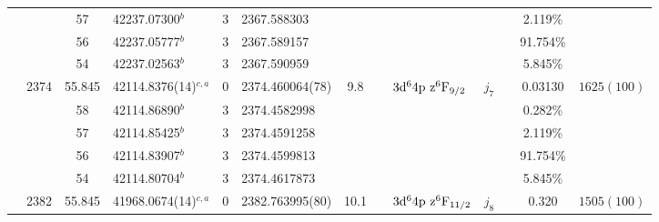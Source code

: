 \begin{table*}
\begin{center}
{\begin{tabular}{:l;l;c;l;c;l;c;l;l;c;c;c;c}
\rowstyle{\itshape}               &        & 57        & 42237.07300$^{b}$                & 3 &   2367.588303      &      & $                                        $ & $                                        $ & $      $ &              & 2.119\%   & $          $\\
\rowstyle{\itshape}               &        & 56        & 42237.05777$^{b}$                & 3 &   2367.589157      &      & $                                        $ & $                                        $ & $      $ &              & 91.754\%  & $          $\\
\rowstyle{\itshape}               &        & 54        & 42237.02563$^{b}$                & 3 &   2367.590959      &      & $                                        $ & $                                        $ & $      $ &              & 5.845\%   & $          $\\
                                  & 2374   & 55.845    & 42114.8376(14)$^{c,a}$           & 0 &   2374.460064(78)  &  9.8 & $                                        $ & $3\rm{d}^64\rm{p~z}^6\rm{F}_{9/2}        $ & $j_{7} $ &              & 0.03130   & $ 1625(100)$\\
\rowstyle{\itshape}               &        & 58        & 42114.86890$^{b}$                & 3 &  2374.4582998      &      & $                                        $ & $                                        $ & $      $ &              & 0.282\%   & $          $\\
\rowstyle{\itshape}               &        & 57        & 42114.85425$^{b}$                & 3 &  2374.4591258      &      & $                                        $ & $                                        $ & $      $ &              & 2.119\%   & $          $\\
\rowstyle{\itshape}               &        & 56        & 42114.83907$^{b}$                & 3 &  2374.4599813      &      & $                                        $ & $                                        $ & $      $ &              & 91.754\%  & $          $\\
\rowstyle{\itshape}               &        & 54        & 42114.80704$^{b}$                & 3 &  2374.4617873      &      & $                                        $ & $                                        $ & $      $ &              & 5.845\%   & $          $\\
                                  & 2382   & 55.845    & 41968.0674(14)$^{c,a}$           & 0 &   2382.763995(80)  & 10.1 & $                                        $ & $3\rm{d}^64\rm{p~z}^6\rm{F}_{11/2}       $ & $j_{8} $ &              & 0.320     & $ 1505(100)$\\

\end{tabular}}
\end{center}
\end{table*}
